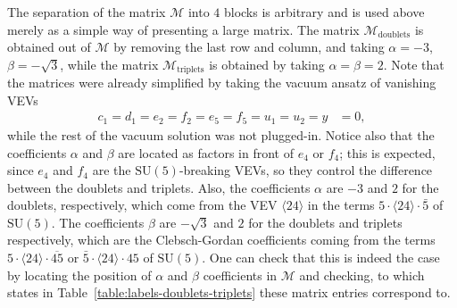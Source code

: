 \documentclass[a4paper,12pt]{article}
\def\SU{\mathrm{SU}}
\begin{document}
The separation of the matrix $\mathcal{M}$ into $4$ blocks is arbitrary and is used above merely as a simple way of presenting a large matrix. The matrix $\mathcal{M}_{\textrm{doublets}}$ is obtained out of $\mathcal{M}$ by removing the last row and column, and taking $\alpha=-3$, $\beta=-\sqrt{3}$, while the matrix $\mathcal{M}_{\textrm{triplets}}$ is obtained by taking $\alpha=\beta=2$. Note that the matrices were already simplified by taking the vacuum ansatz of vanishing VEVs
\begin{align}
c_1=d_1=e_2=f_2=e_5=f_5=u_1=u_2=y&=0,
\end{align}
\noindent
while the rest of the vacuum solution was not plugged-in. Notice also that the coefficients $\alpha$ and $\beta$ are located as factors in front of $e_4$ or $f_4$; this is expected, since $e_4$ and $f_4$ are the $\SU(5)$-breaking VEVs, so they control the difference between the doublets and triplets. Also, the coefficients $\alpha$ are $-3$ and $2$ for the doublets, respectively, which come from the VEV $\langle 24\rangle$ in the terms $5\cdot\langle 24\rangle\cdot\bar{5}$ of $\SU(5)$. The coefficients $\beta$ are $-\sqrt{3}$ and $2$ for the doublets and triplets respectively, which are the Clebsch-Gordan coefficients coming from the terms $5\cdot\langle 24\rangle\cdot \overline{45}$ or $\bar{5}\cdot\langle 24\rangle\cdot 45$ of $\SU(5)$. One can check that this is indeed the case by locating the position of $\alpha$ and $\beta$ coefficients in $\mathcal{M}$ and checking, to which states in Table~\ref{table:labels-doublets-triplets} these matrix entries correspond to.
\end{document}
